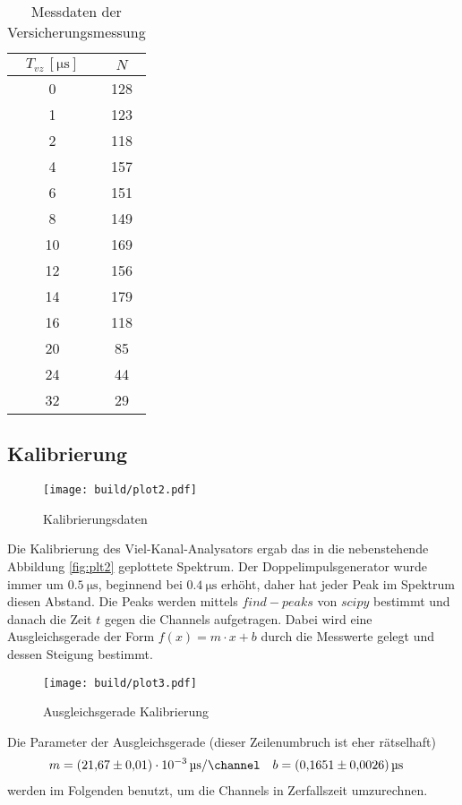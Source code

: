 \begin{table}[H]
	\centering
	\begin{tabular}{c c}
		\toprule
		$T_{vz} \, [\unit{\us}]$ & $N $  \\
		\midrule
        0  & 128 \\
        1  & 123 \\
        2  & 118 \\
        4  & 157 \\ 
        6  & 151 \\
        8  & 149 \\
        10 & 169 \\
        12 & 156 \\
        14 & 179 \\
        16 & 118 \\
        20 & 85  \\ 
        24 & 44  \\
        32 & 29  \\
		\bottomrule
	\end{tabular}
    \caption{Messdaten der Versicherungsmessung}
    \label{tab:data1}
\end{table}

\subsection{Kalibrierung}

\begin{wrapfigure}{r}{0.6\textwidth}
	\centering
	\texttt{[image: build/plot2.pdf]}
	\caption{Kalibrierungsdaten}\label{fig:plt2}
\end{wrapfigure}

Die Kalibrierung des Viel-Kanal-Analysators ergab das in die nebenstehende Abbildung \eqref{fig:plt2} geplottete Spektrum. 
Der Doppelimpulsgenerator wurde immer um $\qty{0.5}{\us}$, beginnend bei $\qty{0.4}{\us}$ erhöht, daher hat jeder Peak im Spektrum diesen Abstand.
Die Peaks werden mittels  $find-peaks$ von $scipy$ \cite{scipy} bestimmt und danach die Zeit $t$ gegen die Channels aufgetragen. 
Dabei wird eine Ausgleichsgerade der Form $f(x)=m \cdot x+b$ durch die Messwerte gelegt und dessen Steigung bestimmt. 
$$ $$ %
\begin{figure}[H]
	\centering
	\texttt{[image: build/plot3.pdf]}
	\caption{Ausgleichsgerade Kalibrierung}\label{fig:plt3}
\end{figure}

Die Parameter der Ausgleichsgerade (dieser Zeilenumbruch ist eher rätselhaft)
\begin{align*}
	m&=\qty{21,67(0,01)e-3}{\us\per\channel} & 
	b&=\qty{0,1651(0,0026)}{\us}
\end{align*}%
%
werden im Folgenden benutzt, um die Channels in Zerfallszeit umzurechnen. 

